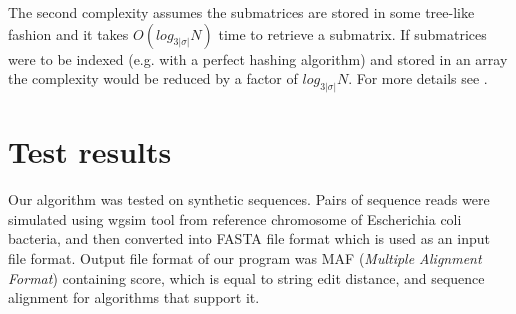 \documentclass[times, utf8, seminar, numeric]{fer}
\begin{document}
The second complexity assumes the submatrices are stored in some tree-like fashion and it takes $O(log_{3|\sigma|}N)$ time to retrieve a submatrix. If submatrices were to be indexed (e.g. with a perfect hashing algorithm) and stored in an array the complexity would be reduced by a factor of $log_{3|\sigma|}N$. For more details see \citep{gusfield1997algorithms}.

\chapter{Test results}
Our algorithm was tested on synthetic sequences. Pairs of sequence reads were simulated using wgsim tool from reference chromosome of Escherichia coli bacteria, and then converted into FASTA file format which is used as an input file format. Output file format of our program was MAF (\textit{Multiple Alignment Format}) containing score, which is equal to string edit distance, and sequence alignment for algorithms that support it. 
\end{document}

